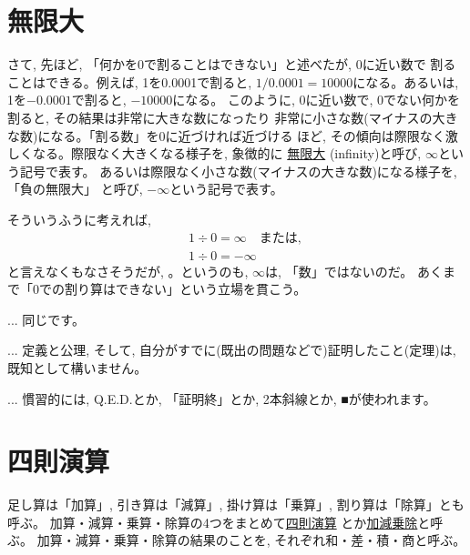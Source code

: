 \section{無限大}

さて, 先ほど, 「何かを0で割ることはできない」と述べたが, 0に近い数で
割ることはできる。例えば, 1を0.0001で割ると, 
$1/0.0001=10000$になる。あるいは, 1を$-0.0001$で割ると, $-10000$になる。
このように, 0に近い数で, 0でない何かを割ると, その結果は非常に大きな数になったり
非常に小さな数(マイナスの大きな数)になる。「割る数」を0に近づければ近づける
ほど, その傾向は際限なく激しくなる。際限なく大きくなる様子を, 象徴的に
\underline{無限大} (infinity)と呼び, $\infty$という記号で表す。
あるいは際限なく小さな数(マイナスの大きな数)になる様子を, 「負の無限大」
と呼び, $-\infty$という記号で表す。

そういうふうに考えれば, 
\begin{eqnarray}
&&1\div 0 = \infty\text{　または, }\nonumber\\
&&1\div 0 = -\infty
\end{eqnarray}
と言えなくもなさそうだが, 。というのも, 
$\infty$は, 「数」ではないのだ。
あくまで「0での割り算はできない」という立場を貫こう。\mv

\begin{faq}{\small{}
... 同じです。}\end{faq}

\begin{faq}{\small{}
... 定義と公理, そして, 自分がすでに(既出の問題などで)証明したこと(定理)は, 既知として構いません。}\end{faq}

\begin{faq}{\small{}
... 慣習的には, Q.E.D.とか, 「証明終」とか, 2本斜線とか, ■が使われます。}\end{faq}



\section{四則演算}\label{sec:realnum_calc}

足し算は「加算」, 
引き算は「減算」, 
掛け算は「乗算」,  
割り算は「除算」とも呼ぶ。
加算・減算・乗算・除算の4つをまとめて\underline{四則演算}
とか\underline{加減乗除}と呼ぶ。
加算・減算・乗算・除算の結果のことを, それぞれ和・差・積・商と呼ぶ。\\

